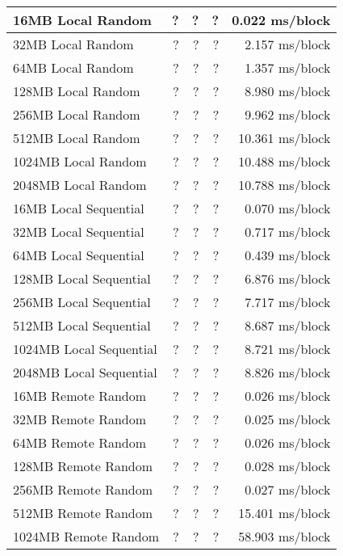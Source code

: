 \begin{table}[h]
\begin{center}
\begin{tabular}{| l | r | r | r | r |}
16MB Local Random		& ?		& ?       & ?        & 0.022  ms/block \\ \hline
32MB Local Random		& ?		& ?       & ?        & 2.157  ms/block \\ \hline
64MB Local Random		& ?		& ?       & ?        & 1.357  ms/block \\ \hline
128MB Local Random 		& ?		& ?       & ?        & 8.980  ms/block \\ \hline
256MB Local Random		& ?		& ?       & ?        & 9.962  ms/block \\ \hline
512MB Local Random		& ?		& ?       & ?        & 10.361  ms/block \\ \hline
1024MB Local Random		& ?		& ?       & ?        & 10.488  ms/block \\ \hline
2048MB Local Random		& ?		& ?       & ?        & 10.788  ms/block \\ \hline\hline

16MB Local Sequential		& ?		& ?       & ?        & 0.070   ms/block \\ \hline
32MB Local Sequential		& ?		& ?       & ?        & 0.717   ms/block \\ \hline
64MB Local Sequential		& ?		& ?       & ?        & 0.439   ms/block \\ \hline
128MB Local Sequential 	& ?		& ?       & ?        & 6.876   ms/block \\ \hline
256MB Local Sequential	& ?		& ?       & ?        & 7.717   ms/block \\ \hline
512MB Local Sequential	& ?		& ?       & ?        & 8.687   ms/block \\ \hline
1024MB Local Sequential	& ?		& ?       & ?        & 8.721   ms/block \\ \hline
2048MB Local Sequential	& ?		& ?       & ?        & 8.826   ms/block \\ \hline\hline

16MB Remote Random		& ?		& ?       & ?        & 0.026   ms/block \\ \hline
32MB Remote Random		& ?		& ?       & ?        & 0.025   ms/block \\ \hline
64MB Remote Random		& ?		& ?       & ?        & 0.026   ms/block \\ \hline
128MB Remote Random 		& ?		& ?       & ?        & 0.028   ms/block \\ \hline
256MB Remote Random		& ?		& ?       & ?        & 0.027   ms/block \\ \hline
512MB Remote Random		& ?		& ?       & ?        & 15.401   ms/block \\ \hline
1024MB Remote Random		& ?		& ?       & ?        & 58.903   ms/block \\ \hline\hline


\end{tabular}
\end{center}
\end{table}
